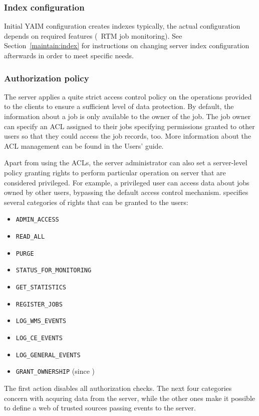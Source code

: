 \subsubsection{Index configuration}

Initial YAIM configuration creates \LB indexes typically,
the actual configuration depends on required features (\eg\ RTM job monitoring).
See Section~\ref{maintain:index} for instructions
on changing \LB server index configuration afterwards in order
to meet specific needs.

\subsubsection{Authorization policy}
\label{inst:authz}
The \LB server applies a quite strict access control policy on the
operations provided to the clients to ensure a sufficient level of data
protection. By default, the information about a job is only available to the
owner of the job. The job owner can specify an ACL assigned to their jobs
specifying permissions granted to other users so that they could access the
job records, too. More information about the ACL management can be found in
the \LB Users' guide.

Apart from using the ACLs, the \LB server administrator can also set a
server-level policy granting rights to perform particular operation on \LB
server that are considered privileged.
For example, a privileged
user can access data about jobs owned by other users, bypassing the default
\LB access control mechanism.  specifies several categories of
rights that can be granted to the users:

\begin{itemize}
\item \verb'ADMIN_ACCESS'
\item \verb'READ_ALL'
\item \verb'PURGE'
\item \verb'STATUS_FOR_MONITORING'
\item \verb'GET_STATISTICS'
\item \verb'REGISTER_JOBS'
\item \verb'LOG_WMS_EVENTS'
\item \verb'LOG_CE_EVENTS'
\item \verb'LOG_GENERAL_EVENTS'
\item \verb'GRANT_OWNERSHIP' (since )
\end{itemize}

The first action disables all authorization checks. The next four categories concern with acquring data from the \LB
server, while the other ones make it possible to define a web of trusted sources
passing events to the \LB server.

